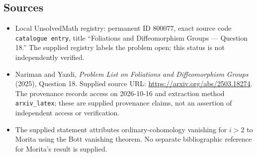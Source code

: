 \documentclass[11pt]{article}
\begin{document}
\subsection{Sources}
\begin{itemize}
\item Local UnsolvedMath registry: permanent ID \(800077\), exact source code \texttt{catalogue entry}, title ``Foliations and Diffeomorphism Groups --- Question 18.'' The supplied registry labels the problem open; this status is not independently verified.
\item Nariman and Yazdi, \emph{Problem List on Foliations and Diffeomorphism Groups} (2025), Question 18. Supplied source URL: \url{https://arxiv.org/abs/2503.18274}. The provenance records access on 2026-10-16 and extraction method \texttt{arxiv\_latex}; these are supplied provenance claims, not an assertion of independent access or verification.
\item The supplied statement attributes ordinary-cohomology vanishing for \(i>2\) to Morita using the Bott vanishing theorem. No separate bibliographic reference for Morita's result is supplied.
\end{itemize}
\end{document}
